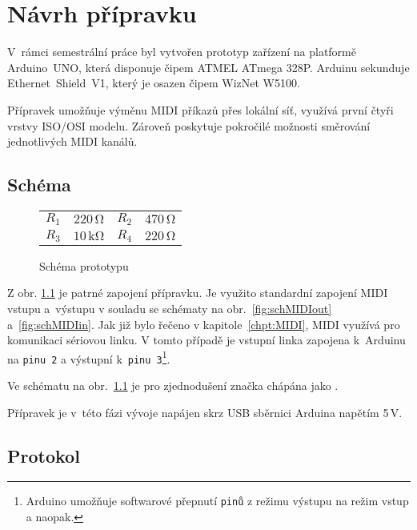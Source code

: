 \chapter{Návrh přípravku}
V~rámci semestrální práce byl vytvořen prototyp zařízení na platformě Arduino~UNO, která disponuje čipem ATMEL ATmega 328P. Arduinu sekunduje \linebreak Ethernet~Shield~V1, který je osazen čipem WizNet W5100. 

Přípravek umožňuje výměnu \acs{MIDI} příkazů přes lokální síť, využívá první čtyři vrstvy ISO/OSI modelu. Zároveň poskytuje pokročilé možnosti směrování jednotlivých \acs{MIDI} kanálů.

\section{Schéma}\label{chpt:Schema}
\begin{figure}[h]
    \centering
    
    \begin{tabular}{l c l c}
        \small
        $R_1$ & $220\,\mathrm{\Omega}$ & $R_2$ & $470\,\mathrm{\Omega}$ \\
        $R_3$ & $10\,\mathrm{k\Omega}$ & $R_4$ & $220\,\mathrm{\Omega}$
    \end{tabular}
    \caption{Schéma prototypu \cite{Indest}} 
    \label{fig:schPrototype}
\end{figure}

Z obr. \ref{fig:schPrototype} je patrné zapojení přípravku. Je využito standardní zapojení \acs{MIDI} vstupu a~výstupu v souladu se schématy na obr.~\ref{fig:schMIDIout} a~\ref{fig:schMIDIin}. Jak již bylo řečeno v kapitole~\ref{chpt:MIDI}, \acs{MIDI} využívá pro komunikaci sériovou linku. V tomto případě je vstupní linka zapojena k~Arduinu na \texttt{pinu~2} a výstupní k~\texttt{pinu~3}\footnote{Arduino umožňuje softwarové přepnutí \texttt{pinů} z režimu výstupu na režim vstup a naopak.}. 

Ve schématu na obr.~\ref{fig:schPrototype} je pro zjednodušení značka  chápána jako .

Přípravek je v~této fázi vývoje napájen skrz \acs{USB} sběrnici Arduina napětím 5\,\unit{V}. 


\section{Protokol}




